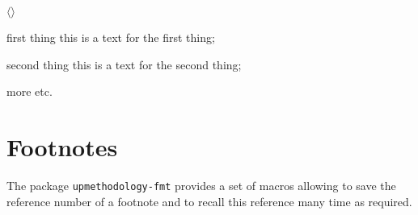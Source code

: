 \documentclass[book]{upmethodology-document}
\begin{document}
\begin{enumdescriptionx}[a]{$\langle$}{$\rangle$}
\item[first thing] this is a text for the first thing;
\item[second thing] this is a text for the second thing;
\item[more] etc.
\end{enumdescriptionx}


\section{Footnotes}

The package \texttt{upmethodology-fmt} provides a set of macros allowing to save the reference number of a footnote and to recall this reference many time as required.
\end{document}
